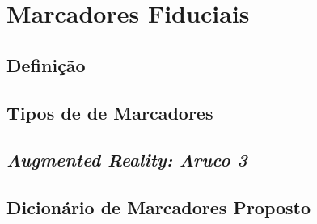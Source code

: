 \chapter{Marcadores Fiduciais}

\section{Definição}

\section{Tipos de de Marcadores}

\section{\textit{Augmented Reality: Aruco 3}}

\section{Dicionário de Marcadores Proposto}